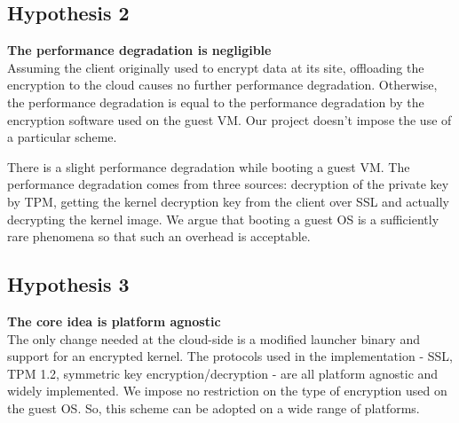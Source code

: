\documentclass[11pt,pdftex]{article}
\begin{document}
\subsection{Hypothesis 2}
{\bf The performance degradation is negligible}\\
Assuming the client originally used to encrypt data at its site, offloading the encryption to the cloud causes no further performance degradation. Otherwise, the performance degradation is equal to the performance degradation by the encryption software used on the guest VM. Our project doesn't impose the use of a particular scheme.

There is a slight performance degradation while booting a guest VM. The performance degradation comes from three sources: decryption of the private key by TPM, getting the kernel decryption key from the client over SSL and actually decrypting the kernel image. We argue that booting a guest OS is a sufficiently rare phenomena so that such an overhead is acceptable. 

\subsection{Hypothesis 3}
{\bf The core idea is platform agnostic}\\
The only change needed at the cloud-side is a modified launcher binary and support for an encrypted kernel. The protocols used in the implementation - SSL, TPM 1.2, symmetric key encryption/decryption - are all platform agnostic and widely implemented. We impose no restriction on the type of encryption used on the guest OS. So, this scheme can be adopted on a wide range of platforms.
\end{document}
